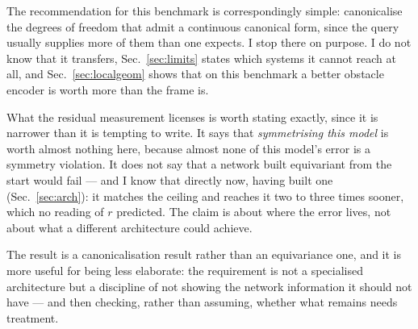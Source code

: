 \documentclass[11pt,a4paper]{article}
\begin{document}
The recommendation for this benchmark is correspondingly simple: canonicalise the
degrees of freedom that admit a continuous canonical form, since the query
usually supplies more of them than one expects. I stop there on purpose. I do not
know that it transfers, Sec.~\ref{sec:limits} states which systems it cannot
reach at all, and Sec.~\ref{sec:localgeom} shows that on this benchmark a better
obstacle encoder is worth more than the frame is.

What the residual measurement licenses is worth stating exactly, since it is
narrower than it is tempting to write. It says that \emph{symmetrising this
model} is worth almost nothing here, because almost none of this model's error is
a symmetry violation. It does not say that a network built equivariant from the
start would fail --- and I know that directly now, having built one
(Sec.~\ref{sec:arch}): it matches the ceiling and reaches it two to three times
sooner, which no reading of $r$ predicted. The claim is about where the error lives, not about
what a different architecture could achieve.

The result is a canonicalisation result rather than an equivariance one, and it
is more useful for being less elaborate: the requirement is not a specialised
architecture but a discipline of not showing the network information it should
not have --- and then checking, rather than assuming, whether what remains needs
treatment.
\end{document}
